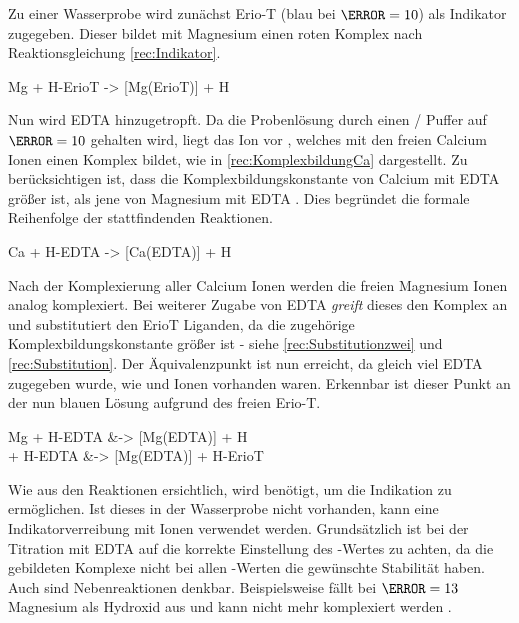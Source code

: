 \documentclass{article}
\begin{document}
      Zu einer Wasserprobe wird zunächst Erio-T (blau bei $\pH=10$) als Indikator zugegeben. Dieser bildet mit Magnesium einen roten Komplex nach Reaktionsgleichung \ref{rec:Indikator}. 
        
      \begin{reaction}
        Mg\pch[2]\aq{} + H-ErioT\mch[2]\aq{} -> [Mg(ErioT)]\mch\aq{} + H\pch\aq{} \label{rec:Indikator}
      \end{reaction}
      
      Nun wird EDTA hinzugetropft. Da die Probenlösung durch einen / Puffer auf $\pH=10$ gehalten wird, liegt das  Ion vor \cite[S. 142]{JanderBlasius}, welches mit den freien Calcium Ionen einen Komplex bildet, wie in \ref{rec:KomplexbildungCa} dargestellt. Zu berücksichtigen ist, dass die Komplexbildungskonstante von Calcium mit EDTA größer ist, als jene von Magnesium mit EDTA \cite{JanderBlasius}. Dies begründet die formale Reihenfolge der stattfindenden Reaktionen. 
      
      \begin{reaction}
        Ca\pch[2]\aq{} + H-EDTA\mch[3]\aq{} -> [Ca(EDTA)]\mch[2]\aq{} + H\pch\aq{} \label{rec:KomplexbildungCa}
      \end{reaction}
      
      Nach der Komplexierung aller Calcium Ionen werden die freien Magnesium Ionen analog komplexiert. Bei weiterer Zugabe von EDTA \textit{greift} dieses den \ch{[Mg(ErioT)]\mch[2]\aq{}} Komplex an und substitutiert den ErioT Liganden, da die zugehörige Komplexbildungskonstante größer ist - siehe \ref{rec:Substitutionzwei} und  \ref{rec:Substitution}. Der Äquivalenzpunkt ist nun erreicht, da gleich viel EDTA zugegeben wurde, wie  und  Ionen vorhanden waren. Erkennbar ist dieser Punkt an der nun blauen Lösung aufgrund des freien Erio-T.
      
      \begin{reactions}
        Mg\pch[2]\aq{} + H-EDTA\mch[3]\aq{} &-> [Mg(EDTA)]\mch[2]\aq{} + H\pch\aq{} \label{rec:Substitutionzwei} \\
        [Mg(ErioT)]\mch\aq{} + H-EDTA\mch[3]\aq{} &-> [Mg(EDTA)]\mch[2]\aq{}  + H-ErioT\mch[2]\aq{} \label{rec:Substitution}
      \end{reactions}
      
      Wie aus den Reaktionen ersichtlich, wird  benötigt, um die Indikation zu ermöglichen. Ist dieses in der Wasserprobe nicht vorhanden, kann eine Indikatorverreibung mit  Ionen verwendet werden. Grundsätzlich ist bei der Titration mit EDTA auf die korrekte Einstellung des \pH-Wertes zu achten, da die gebildeten Komplexe nicht bei allen \pH-Werten die gewünschte Stabilität haben. Auch sind Nebenreaktionen denkbar. Beispielsweise fällt bei $\pH=13$ Magnesium als Hydroxid aus und kann nicht mehr komplexiert werden \cite[S. 146]{JanderBlasius}.
      
\end{document}
